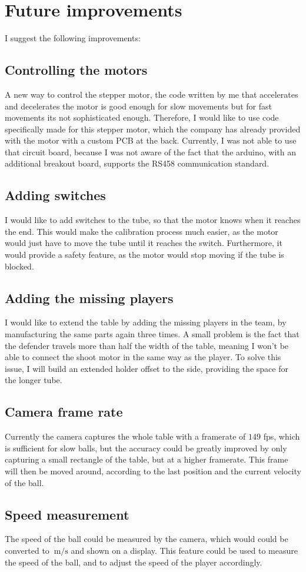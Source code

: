 \section{Future improvements}\label{sec:improvements}
I suggest the following improvements:
\subsection*{Controlling the motors}
A new way to control the stepper motor, the code written by me that accelerates and decelerates the motor is good enough for slow movements but for fast movements its not sophisticated enough.
Therefore, I would like to use code specifically made for this stepper motor, which the company has already provided with the motor with a custom PCB at the back.
Currently, I was not able to use that circuit board, because I was not aware of the fact that the arduino, with an additional breakout board, supports the RS458 communication standard.
\subsection*{Adding switches}
I would like to add switches to the tube, so that the motor knows when it reaches the end.
This would make the calibration process much easier, as the motor would just have to move the tube until it reaches the switch.
Furthermore, it would provide a safety feature, as the motor would stop moving if the tube is blocked.
\subsection*{Adding the missing players}
I would like to extend the table by adding the missing players in the team, by manufacturing the same parts again three times.
A small problem is the fact that the defender travels more than half the width of the table, meaning I won't be able to connect the shoot motor in the same way as the player.
To solve this issue, I will build an extended holder offset to the side, providing the space for the longer tube.
\subsection*{Camera frame rate}
Currently the camera captures the whole table with a framerate of $149$ fps, which is sufficient for slow balls, but the accuracy could be greatly improved by only capturing a small rectangle of the table, but at a higher framerate.
This frame will then be moved around, according to the last position and the current velocity of the ball.
\subsection*{Speed measurement}
The speed of the ball could be measured by the camera, which would could be converted to $\qty[per-mode=symbol]{}{\m\per\s}$ and shown on a display.
This feature could be used to measure the speed of the ball, and to adjust the speed of the player accordingly.

